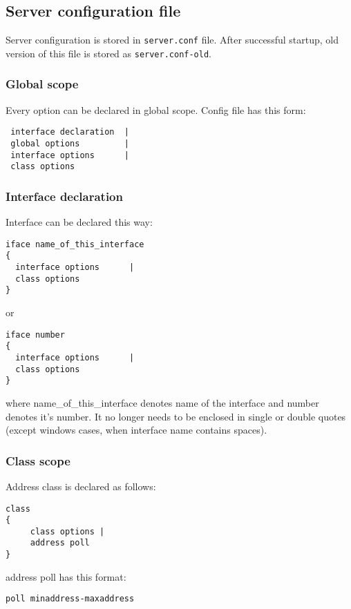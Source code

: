 \subsection{Server configuration file}

Server configuration is stored in \verb+server.conf+ file. After
successful startup, old version of this file is stored as
\verb+server.conf-old+.

\subsubsection{Global scope}

Every option can be declared in global scope.
Config file has this form:

\begin{verbatim}
 interface declaration  |
 global options         |
 interface options      |
 class options          
\end{verbatim}

\subsubsection{Interface declaration}

Interface can be declared this way:
\begin{verbatim}
iface name_of_this_interface
{
  interface options      |
  class options        
}
\end{verbatim}

or 

\begin{verbatim}
iface number 
{
  interface options      |
  class options        
}
\end{verbatim}

where name\_of\_this\_interface denotes name of the interface and
number denotes it's number. It no longer needs to be enclosed in
single or double quotes (except windows cases, when interface name
contains spaces).

\subsubsection{Class scope}
Address class is declared as follows:

\begin{verbatim}
class
{  
     class options |
     address poll    
}
\end{verbatim}

address poll has this format:
\begin{verbatim}
poll minaddress-maxaddress
\end{verbatim}

